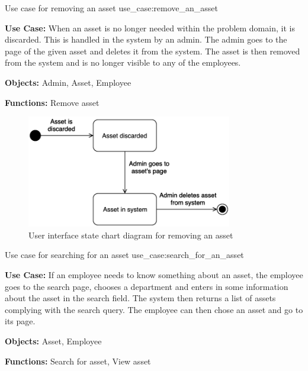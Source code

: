 \newpage

    {Use case for removing an asset}
    {use_case:remove_an_asset}
    {
        \textbf{Use Case:} When an asset is no longer needed within the problem domain, it is discarded. This is handled in the system by an admin. The admin goes to the page of the given asset and deletes it from the system. The asset is then removed from the system and is no longer visible to any of the employees.
    
        \vskip 0.2cm
        
        \textbf{Objects:} Admin, Asset, Employee
        
        \vskip 0.2cm
        
        \textbf{Functions:} Remove asset
    }

\begin{figure}[H]
    \centering
    \includegraphics[width=0.8\textwidth]{figures/UC_Remove_asset.png}
    \caption{User interface state chart diagram for removing an asset}
    \label{fig:remove_asset_statechart}
\end{figure}

\newpage

    {Use case for searching for an asset}
    {use_case:search_for_an_asset}
    {
        \textbf{Use Case:} If an employee needs to know something about an asset, the employee goes to the search page, chooses a department and enters in some information about the asset in the search field. The system then returns a list of assets complying with the search query. The employee can then chose an asset and go to its page.
    
        \vskip 0.2cm
        
        \textbf{Objects:} Asset, Employee
        
        \vskip 0.2cm
        
        \textbf{Functions:} Search for asset, View asset
    }

